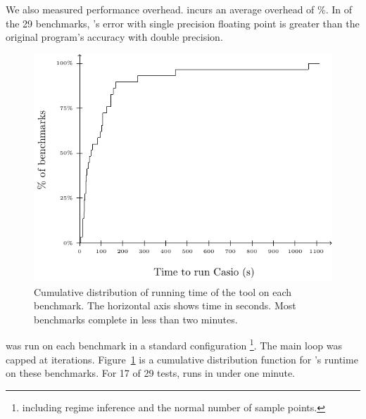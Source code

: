 \documentclass[paper.tex]{subfiles}
\begin{document}
 We also measured performance overhead.   \casio incurs an average overhead of
\%.  In  of the 29 benchmarks, \casio's error with
single precision floating point is greater than the original program's
accuracy with double precision.

\begin{figure}
\includegraphics[width=0.9\columnwidth]{fig/eval-casio-time.pdf}
\caption{Cumulative distribution of running time of the \casio tool on
  each benchmark. The horizontal axis shows time in seconds. Most
  benchmarks complete in less than two minutes.}
\label{fig:eval-casio-time}
\end{figure}

\casio was run on each benchmark in a standard configuration%
\footnote{including regime inference and the normal number of sample
  points.}.  The main loop was capped at \nIters iterations.
Figure~\ref{fig:eval-casio-time} is a cumulative distribution function for
\casio's runtime on these benchmarks.  For 17 of 29 tests, \casio runs
in under one minute. 
\end{document}
